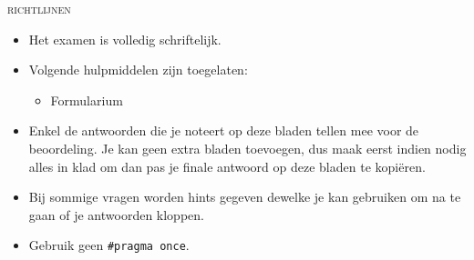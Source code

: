 \usepackage{booktabs}


\newcommand{\cpp}{C++}



\begin{examguidelines}
  \begin{center}
    \textsc{\Huge richtlijnen}
  \end{center}
  \vskip1cm%
  \Large
  \begin{itemize}
    \item Het examen is volledig schriftelijk.
    \item Volgende hulpmiddelen zijn toegelaten:
          \begin{itemize}
            \item Formularium
          \end{itemize}
    \item Enkel de antwoorden die je noteert op deze bladen
          tellen mee voor de beoordeling. Je kan geen extra bladen
          toevoegen, dus maak eerst indien nodig alles in klad om dan pas
          je finale antwoord op deze bladen te kopi\"eren.
    \item Bij sommige vragen worden hints gegeven dewelke je kan gebruiken
          om na te gaan of je antwoorden kloppen.
    \item Gebruik geen \verb'#pragma once'.
  \end{itemize}
\end{examguidelines}

% 



% 
% 
% 

% 
% 
% 
% 

% 
% 
% 
% 

% 
% 
% 



